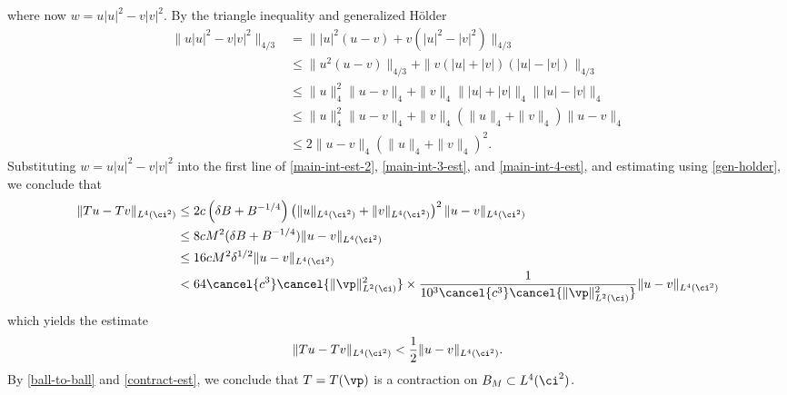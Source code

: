 %
%
where now $w = u|u|^2 - v|v|^2$. By the triangle inequality and generalized
H\"{o}lder
%
%
\begin{equation}
	\label{gen-holder}
	\begin{split}
		\|u |u|^2 - v |v|^2\|_{4/3}
		& = \| |u|^2\left( u -v \right) + v\left( |u|^2 - |v|^2 
		\right)\|_{4/3}
		\\
		& \le \|u^2\left( u -v \right)\|_{4/3} + \|v\left( |u| + |v| 
		\right)\left( |u| - |v| \right) \|_{4/3}
		\\
		& \le \|u\|_4^2 \|u -v \|_4 + \|v\|_4  \| |u| + |v| \|_4 
		\| |u| - |v |\|_4 
		\\
		& \le \|u \|_4^2 \|u -v\|_4 + \|v\|_4\left( \|u\|_4 + \|v\|_4 
		\right) \|u -v \|_4
		\\
		& \le 2 \|u -v \|_4 \left(  \|u\|_4 + \|v\|_4 \right)^2.
	\end{split}
\end{equation}
%
%
Substituting $w = u|u|^2 - v|v|^2$ into the first line of \eqref{main-int-est-2}, 
\eqref{main-int-3-est}, and \eqref{main-int-4-est}, and estimating using  
\eqref{gen-holder}, we conclude that
%
%
\begin{equation*}
	\begin{split}
		\|Tu - Tv\|_{L^4(\ci^2)}
		& \le 2c\left( \delta B + B^{-1/4} 
		\right)\left( \|u\|_{L^4(\ci^2)} +
		\|v\|_{L^4(\ci^2)}\right)^2 \|u -v \|_{L^4(\ci^2)}
		\\
		& \le 8 c M^2(\delta B + B^{-1/4}) \|u - v\|_{L^4(\ci^2)}
		\\
		& \le 16cM^2 \delta^{1/2} \|u-v\|_{L^4(\ci^2)}
		\\
		& < 64 \cancel{c^3} \cancel{\|\vp\|_{L^2(\ci)}^2}
		\times \frac{1}{10^3 \cancel{c^3} \cancel{\|\vp\|_{L^2(\ci)}^2}}
		\|u-v\|_{L^4(\ci^2)}
	\end{split}
\end{equation*}
%
%
which yields the estimate
%
%
\begin{equation}
	\label{contract-est}
	\begin{split}
		\|Tu - Tv\|_{L^4(\ci^2)} < \frac{1}{2} \|u -v \|_{L^4(\ci^2)}.
	\end{split}
\end{equation}
%
%
By \eqref{ball-to-ball} and \eqref{contract-est}, we conclude that
$T = T(\vp)$ is a contraction on $B_M \subset L^4(\ci^2)$. 
%
%
%

